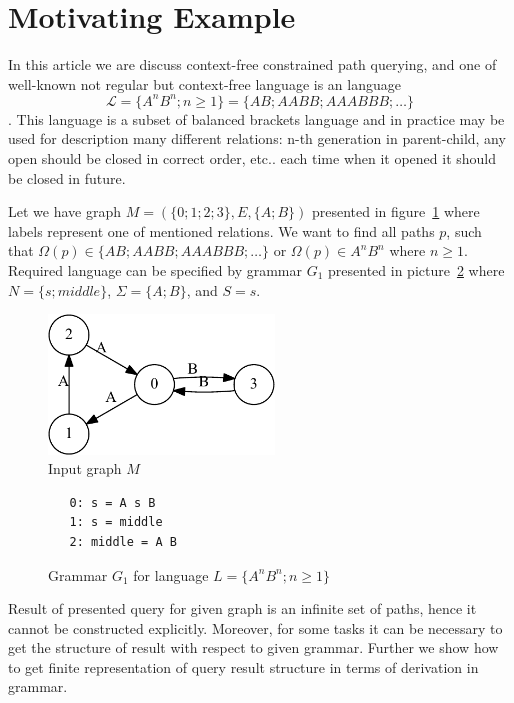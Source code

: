 \section{Motivating Example}

In this article we are discuss context-free constrained path querying, and one of well-known not regular but context-free language is an 
language $$\mathcal{L} = \{A^n B^n; n \geq 1\} = \{AB; AABB; AAABBB; \dots\}$$.
This language is a subset of balanced brackets language and in practice may be used for description many different relations: n-th generation in parent-child, any open should be closed in correct order, etc.. 
each time when it opened it should be closed in future.

Let we have graph $M=(\{0;1;2;3\},E,\{A;B\})$ presented in figure~\ref{input} where labels represent one of mentioned relations.
We want to find all paths $p$, such that $\Omega(p) \in \{AB; AABB; AAABBB; \dots\}$ or $\Omega(p) \in A^n B^n$ where $n \geq 1$.
Required language can be specified by grammar $G_1$ presented in picture~\ref{grammarG} where $N = \{s; middle\}$, $\Sigma = \{A; B\}$, and $S = s$.

\begin{figure}[h]
    \begin{center}
        \includegraphics[width=6cm]{dot/input.pdf}
        \caption{Input graph $M$}
        \label{input}        
    \end{center}
\end{figure}

\begin{figure}[h]
   \begin{center}
\begin{verbatim}
   0: s = A s B 
   1: s = middle
   2: middle = A B
\end{verbatim}
   \caption{Grammar $G_1$ for language $L=\{A^n B^n; n \geq 1\}$}
   \label{grammarG}        
   \end{center}
\end{figure}

Result of presented query for given graph is an infinite set of paths, hence it cannot be constructed explicitly. 
Moreover, for some tasks it can be necessary to get the structure of result with respect to given grammar.
Further we show how to get finite representation of query result structure in terms of derivation in grammar.
